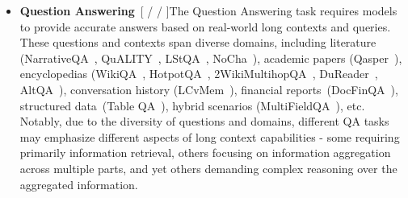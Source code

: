 \documentclass[11pt, a4paper, logo, copyright, nonumbering]{map}
\begin{document}
\begin{itemize}
    \item \textbf{Question Answering}~[ /  / ]\quad The Question Answering task requires models to provide accurate answers based on real-world long contexts and queries. These questions and contexts span diverse domains,  including literature (NarrativeQA~\citep{kovcisky2018narrativeqa}, QuALITY~\citep{pang2022quality}, LStQA~\citep{qiu2024clongeval}, NoCha~\citep{nocha-2024-karp-thai-et-al}), academic papers (Qasper~\citep{dasigi2021dataset}), encyclopedias (WikiQA~\citep{yang2015wikiqa}, HotpotQA~\citep{yang2018hotpotqa}, 2WikiMultihopQA~\citep{ho2020constructing}, DuReader~\citep{he2018dureader}, AltQA~\citep{pal2023giraffe}), conversation history (LCvMem~\citep{qiu2024clongeval}), financial reports~(DocFinQA~\citep{reddy2024docfinqa}), structured data~(Table QA~\citep{zhang2024tablellm}), hybrid scenarios (MultiFieldQA~\citep{bai2023longbench}), etc. Notably, 
    due to the diversity of questions and domains, different QA tasks may emphasize different aspects of long context capabilities - some requiring primarily information retrieval, others focusing on information aggregation across multiple parts, and yet others demanding complex reasoning over the aggregated information.



\end{itemize}
\end{document}
